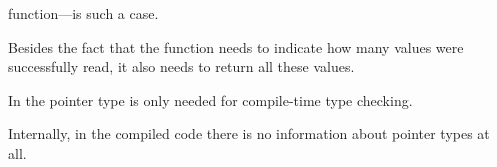 function---is such a case.

Besides the fact that the function needs to indicate how many values were successfully read, it also needs to return all these values.

In \CCpp the pointer type is only needed for compile-time type checking.

Internally, in the compiled code there is no information about pointer types at all.





